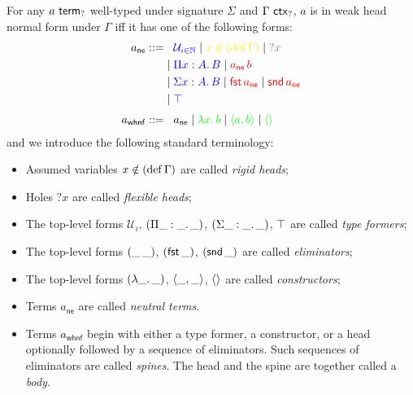 \documentclass[twoside]{report}
\begin{document}
\begin{proposition}
\label{thm:weak_head_normal_form}
For any $a \ \mathsf{term}_{?}$ well-typed under signature $\Sigma$ and $\Gamma \ \mathsf{ctx}_{?}$, $a$ is in weak head normal form under $\Gamma$ iff it has one of the following forms:
$$
\begin{aligned}
a_\mathsf{ne} ::=
    & \phantom{{}\mid{}} \textcolor{blue}{\mathcal U_{i \in \mathbb N}} \mid \textcolor{yellow}{x \notin (\defn \Gamma)} \mid \textcolor{gray}{?x} \\
    & \mid \textcolor{blue}{\ppi x A B} \mid \textcolor{red}{\app {a_\mathsf{ne}} b} \\
    & \mid \textcolor{blue}{\sig x A B} \mid \textcolor{red}{\fst {a_\mathsf{ne}}} \mid \textcolor{red}{\snd {a_\mathsf{ne}}} \\
    & \mid \textcolor{blue}{\unit} \\[0.3em]
a_\mathsf{whnf} ::=
    & \phantom{{}\mid{}} a_\mathsf{ne} \mid \textcolor{green}{\lam x b} \mid \textcolor{green}{\pair a b} \mid \textcolor{green}{\sstar} \\
\end{aligned}
$$
and we introduce the following standard terminology:
\begin{itemize}[noitemsep]
    \item Assumed variables $x \notin (\operatorname{def} \Gamma)$ are called \emph{rigid heads};
    \item Holes $?x$ are called \emph{flexible heads};
    \item The top-level forms $\mathcal U_i$, $(\Pi{\_} : {\_}.\,{\_})$, $(\Sigma{\_} : {\_}.\,{\_})$, $\top$ are called \emph{type formers};
    \item The top-level forms $({\_}\,{\_})$, $(\operatorname{\mathsf{fst}} \_)$, $(\operatorname{\mathsf{snd}} \_)$ are called \emph{eliminators};
    \item The top-level forms $(\lambda{\_}.\,{\_})$, $\langle{\_}, {\_}\rangle$, $\langle\rangle$ are called \emph{constructors};
    \item Terms $a_\mathsf{ne}$ are called \emph{neutral terms}.
    \item Terms $a_\mathsf{whnf}$ begin with either a type former, a constructor, or a head optionally followed by a sequence of eliminators. Such sequences of eliminators are called \emph{spines}. The head and the spine are together called a \emph{body}.
\end{itemize}
\end{proposition}
\end{document}
